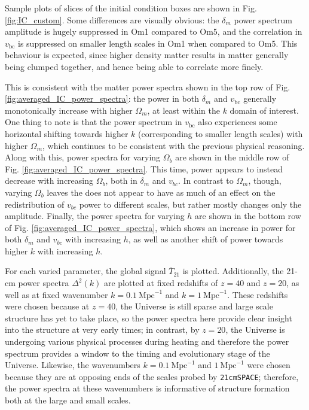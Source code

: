 \documentclass[floats,floatfix,showpacs,amssymb,prd,superscriptaddress,nofootinbib, 11pt]{revtex4-2} %
\newcommand{\code}{\texttt}
\begin{document}
Sample plots of slices of the initial condition boxes are shown in Fig. \ref{fig:IC_custom}. Some differences are visually obvious: the $\delta_m$ power spectrum amplitude is hugely suppressed in Om1 compared to Om5, and the correlation in $v_{\text{bc}}$ is suppressed on smaller length scales in Om1 when compared to Om5. This behaviour is expected, since higher density matter results in matter generally being clumped together, and hence being able to correlate more finely. 

This is consistent with the matter power spectra shown in the top row of Fig. \ref{fig:averaged_IC_power_spectra}: the power in both $\delta_m$ and $v_{\text{bc}}$ generally monotonically increase with higher $\Omega_m$, at least within the $k$ domain of interest. One thing to note is that the power spectrum in $v_{\text{bc}}$ also experiences some horizontal shifting towards higher $k$ (corresponding to smaller length scales) with higher $\Omega_m$, which continues to be consistent with the previous physical reasoning. Along with this, power spectra for varying $\Omega_b$ are shown in the middle row of Fig. \ref{fig:averaged_IC_power_spectra}. This time, power appears to instead decrease with increasing $\Omega_b$, both in $\delta_m$ and $v_{bc}$. In contrast to $\Omega_m$, though, varying $\Omega_b$ leaves the  does not appear to have as much of an effect on the redistribution of $v_{bc}$ power to different scales, but rather mostly changes only the amplitude. Finally, the power spectra for varying $h$ are shown in the bottom row of Fig. \ref{fig:averaged_IC_power_spectra}, which shows an increase in power for both $\delta_m$ and $v_{bc}$ with increasing $h$, as well as another shift of power towards higher $k$ with increasing $h$.

For each varied parameter, the global signal $\overline{T}_{21}$ is plotted. Additionally, the 21-cm power spectra $\Delta^2(k)$ are plotted at fixed redshifts of $z = 40$ and $z = 20$, as well as at fixed wavenumber $k = 0.1 ~\text{Mpc}^{-1}$ and $k = 1 ~\text{Mpc}^{-1}$. These redshifts were chosen because at $z = 40$, the Universe is still sparse and large scale structure has yet to take place, so the power spectra here provide clear insight into the structure at very early times; in contrast, by $z = 20$, the Universe is undergoing various physical processes during heating and therefore the power spectrum provides a window to the timing and evolutionary stage of the Universe. Likewise, the wavenumbers $k = 0.1 ~\text{Mpc}^{-1}$ and $1 ~\text{Mpc}^{-1}$ were chosen because they are at opposing ends of the scales probed by \code{21cmSPACE}; therefore, the power spectra at these wavenumbers is informative of structure formation both at the large and small scales.
\end{document}
